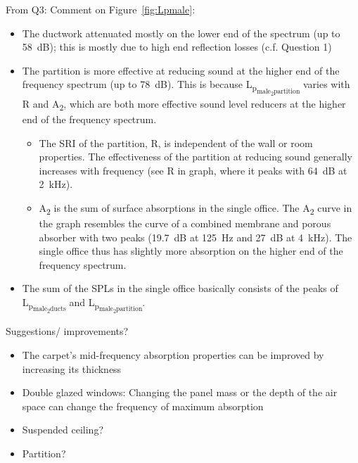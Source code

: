 From Q3: Comment on Figure~\ref{fig:Lpmale}:
\begin{itemize}
	\item The ductwork attenuated mostly on the lower end of the spectrum (up to 58~dB); this is mostly due to high end reflection losses (c.f. Question 1)
	
	\item The partition is more effective at reducing sound at the higher end of the frequency spectrum (up to 78~dB). This is because L\textsubscript{p\textsubscript{male\textsubscript{2}partition}} varies with R and A\textsubscript{2}, which are both more effective sound level reducers at the higher end of the frequency spectrum.
	\begin{itemize}
		\item The SRI of the partition, R, is independent of the wall or room properties.
		The effectiveness of the partition at reducing sound generally increases with frequency (see R in graph, where it peaks with 64~dB at 2~kHz).
		
		\item A\textsubscript{2} is the sum of surface absorptions in the single office.
		The A\textsubscript{2} curve in the graph resembles the curve of a combined membrane and porous absorber with two peaks (19.7~dB at 125~Hz and 27~dB at 4~kHz).
		The single office thus has slightly more absorption on the higher end of the frequency spectrum.
	\end{itemize}

	\item The sum of the SPLs in the single office basically consists of the peaks of L\textsubscript{p\textsubscript{male\textsubscript{2}ducts}} and L\textsubscript{p\textsubscript{male\textsubscript{2}partition}}.
\end{itemize}



Suggestions/ improvements?
\begin{itemize}
	\item The carpet's mid-frequency absorption properties can be improved by increasing its thickness
	\item Double glazed windows: Changing the panel mass or the depth of the air space can change the frequency of maximum absorption
	\item Suspended ceiling?
	\item Partition?
\end{itemize}